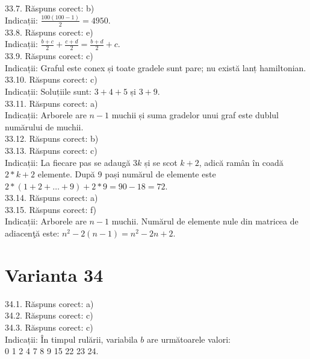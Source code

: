 33.7. Răspuns corect: b)\\
Indicații: $\frac{100(100-1)}{2}=4950$.\\

33.8. Răspuns corect: e)\\
Indicații: $\frac{b+c}{2}+\frac{c+d}{2}=\frac{b+d}{2}+c$.\\

33.9. Răspuns corect: c)\\
Indicații: Graful este conex și toate gradele sunt pare; nu există lanț hamiltonian.\\

33.10. Răspuns corect: c)\\
Indicații: Soluțiile sunt: $3+4+5$ și $3+9$.\\

33.11. Răspuns corect: a)\\
Indicații: Arborele are $n-1$ muchii și suma gradelor unui graf este dublul numărului de muchii.\\

33.12. Răspuns corect: b)\\

33.13. Răspuns corect: c)\\
Indicații: La fiecare pas se adaugă $3 k$ și se scot $k+2$, adică ramân în coadă $2 * k+2$ elemente. După 9 pași numărul de elemente este $2 * (1+2+\ldots+9)+2 * 9=90-18=72$.\\

33.14. Răspuns corect: a)\\

33.15. Răspuns corect: f)\\
Indicații: Arborele are $n-1$ muchii. Numărul de elemente nule din matricea de adiacenţă este: $n^{2}-2(n-1)=n^{2}-2 n+2$.\\

\section*{Varianta 34}

34.1. Răspuns corect: a)\\

34.2. Răspuns corect: c)\\

34.3. Răspuns corect: c)\\
Indicații: În timpul rulării, variabila $b$ are următoarele valori:\\ 0 1 2 4 7 8 9 15 22 23 24.\\

